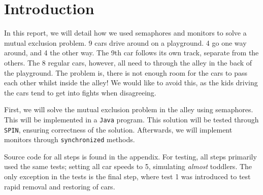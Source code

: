\section*{Introduction}
In this report, we will detail how we used semaphores and monitors to solve a mutual exclusion problem. 9 cars drive around on a playground. 4 go one way around, and 4 the other way. The 9th car follows its own track, separate from the others. The 8 regular cars, however, all need to through the alley in the back of the playground. The problem is, there is not enough room for the cars to pass each other whilst inside the alley! We would like to avoid this, as the kids driving the cars tend to get into fights when disagreeing.

First, we will solve the mutual exclusion problem in the alley using semaphores. This will be implemented in a \texttt{Java} program. This solution will be tested through \texttt{SPIN}, ensuring correctness of the solution. Afterwards, we will implement monitors through \texttt{synchronized} methods. 

Source code for all steps is found in the appendix. For testing, all steps primarily used the same tests; setting all car speeds to 5, simulating \textit{almost} toddlers. The only exception in the tests is the final step, where test 1 was introduced to test rapid removal and restoring of cars.